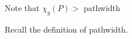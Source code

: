 Note that $\chi_g(P) > $ pathwidth

Recall the definition of pathwidth.
%
%        
%        
%           
%           
%
%
%    
%



